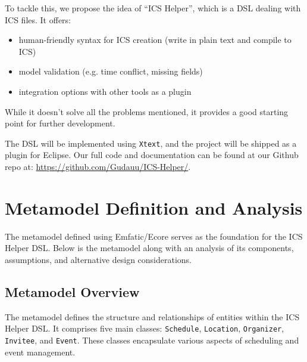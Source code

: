 \documentclass[12pt, letterpaper, twoside]{article}
\begin{document}
To tackle this, we propose the idea of ``ICS Helper'', which is a DSL dealing with ICS files. It offers:
    \begin{itemize}
        \item human-friendly syntax for ICS creation (write in plain text and compile to ICS)
        \item model validation (e.g. time conflict, missing fields)
        \item integration options with other tools as a plugin
    \end{itemize}

While it doesn't solve all the problems mentioned, it provides a good starting point for further development.

The DSL will be implemented using \texttt{Xtext}, and the project will be shipped as a plugin for Eclipse. 
Our full code and documentation can be found at our Github repo at: \url{https://github.com/Gudauu/ICS-Helper/}.

\newpage
\section{Metamodel Definition and Analysis}

The metamodel defined using Emfatic/Ecore serves as the foundation for the ICS Helper DSL. Below is the metamodel along with an analysis of its components, assumptions, and alternative design considerations.

\subsection{Metamodel Overview}

The metamodel defines the structure and relationships of entities within the ICS Helper DSL. It comprises five main classes: \texttt{Schedule}, \texttt{Location}, \texttt{Organizer}, \texttt{Invitee}, and \texttt{Event}. These classes encapsulate various aspects of scheduling and event management.
\end{document}

